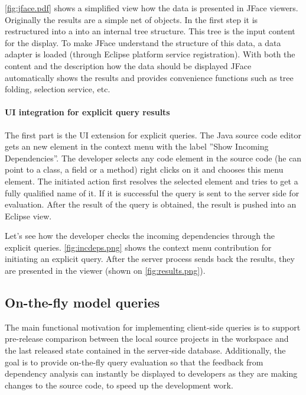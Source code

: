 \autoref{fig:jface.pdf} shows a simplified view how the data is presented in
JFace viewers. Originally the results are a simple net of objects. In the first
step it is restructured into a into an internal tree structure. This tree is the
input content for the display. To make JFace understand  the structure of this
data, a data adapter is loaded (through Eclipse platform service registration).
With both the content and the description how the data should be displayed JFace
automatically shows the results and provides convenience functions such as tree
folding, selection service, etc. 

\paragraph{UI integration for explicit query results} 
The first part is the UI extension for explicit queries. The Java source code
editor gets an new element in the context menu with the label ''Show Incoming
Dependencies''. The developer selects any code element in the source code (he
can point to a class, a field or a method) right clicks on it and chooses this
menu element. The initiated action first resolves the selected element and tries
to get a fully qualified name of it. If it is successful the query is sent to
the server side for evaluation. After the result of the query is obtained, the 
result is pushed into an Eclipse view.

Let's see how the developer checks the incoming dependencies through the
explicit queries.
\autoref{fig:incdeps.png} shows the context menu contribution for initiating an
explicit query. After the server process sends back the results, they are presented 
in the viewer (shown on \autoref{fig:results.png}).
 

\subsection{On-the-fly model queries}

The main functional motivation for implementing client-side queries is to
support pre-release comparison between the local source projects in the
workspace and the last released state contained in the server-side database.
Additionally, the goal is to provide on-the-fly query evaluation so that the
feedback from dependency analysis can instantly be displayed to developers as
they are making changes to the source code, to speed up the development work.

